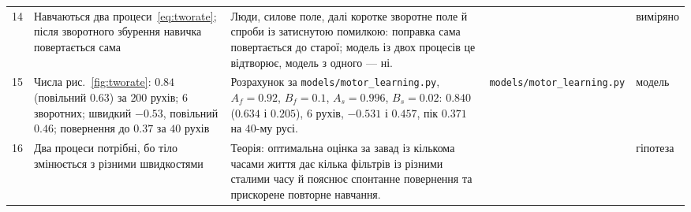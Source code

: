 {\begin{longtable}{>{\raggedright}p{0.5cm}>{\raggedright}p{4.0cm}>{\raggedright}p{5.6cm}>{\raggedright}p{2.3cm}>{\raggedright\arraybackslash}p{1.7cm}}
14 & Навчаються два процеси~\eqref{eq:tworate}; після зворотного збурення навичка повертається сама & Люди, силове поле, далі коротке зворотне поле й спроби із затиснутою помилкою: поправка сама повертається до старої; модель із двох процесів це відтворює, модель з одного --- ні. & \cite{Smith2006} & виміряно \\
15 & Числа рис.~\ref{fig:tworate}: $0.84$ (повільний $0.63$) за $200$ рухів; $6$ зворотних; швидкий $-0.53$, повільний $0.46$; повернення до $0.37$ за $40$ рухів & Розрахунок за \texttt{models/\allowbreak motor\_\allowbreak learning.py}, $A_f=0.92$, $B_f=0.1$, $A_s=0.996$, $B_s=0.02$: $0.840$ ($0.634$ і $0.205$), $6$ рухів, $-0.531$ і $0.457$, пік $0.371$ на $40$-му русі. & \texttt{models/\allowbreak motor\_\allowbreak learning.py} & модель \\
16 & Два процеси потрібні, бо тіло змінюється з різними швидкостями & Теорія: оптимальна оцінка за завад із кількома часами життя дає кілька фільтрів із різними сталими часу й пояснює спонтанне повернення та прискорене повторне навчання. & \cite{Kording2007} & гіпотеза \\
\bottomrule
\end{longtable}}
